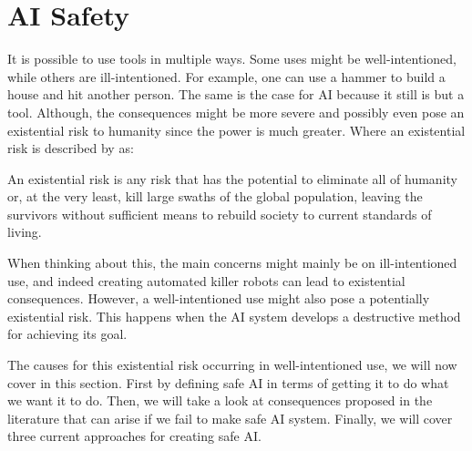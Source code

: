 \documentclass[12pt,A4]{report}
\theoremstyle{definition}
\begin{document}


\section{AI Safety}
It is possible to use tools in multiple ways. Some uses might be well-intentioned, while others are ill-intentioned. For example, one can use a hammer to build a house and hit another person. The same is the case for AI because it still is but a tool. Although, the consequences might be more severe and possibly even pose an existential risk to humanity since the power is much greater. Where an existential risk is described by \citet{FLI} as:
\begin{displayquote}
An existential risk is any risk that has the potential to eliminate all of humanity or, at the very least, kill large swaths of the global population, leaving the survivors without sufficient means to rebuild society to current standards of living.
\end{displayquote}

When thinking about this, the main concerns might mainly be on ill-intentioned use, and indeed creating automated killer robots can lead to existential consequences. However, a well-intentioned use might also pose a potentially existential risk. This happens when the AI system develops a destructive method for achieving its goal. 

The causes for this existential risk occurring in well-intentioned use, we will now cover in this section. First by defining safe AI in terms of getting it to do what we want it to do. Then, we will take a look at consequences proposed in the literature that can arise if we fail to make safe AI system. Finally, we will cover three current approaches for creating safe AI. 

\end{document}
